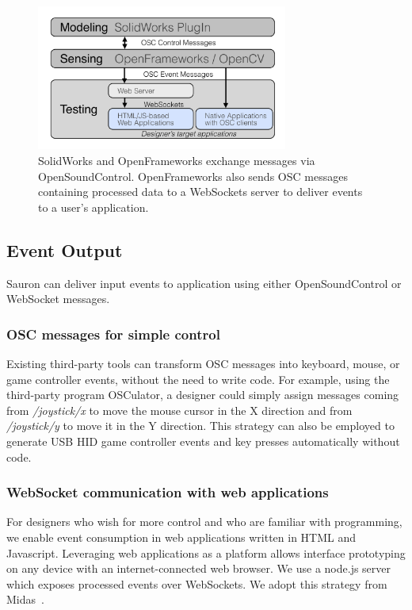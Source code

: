 \begin{figure}
\centering
\includegraphics[width=3.25in]{figures/sauron/arch2outlined.pdf}
\caption{SolidWorks and OpenFrameworks exchange messages via OpenSoundControl.  OpenFrameworks also sends OSC messages containing processed data to a WebSockets server to deliver events to a user's application.}
\label{fig:sauron-arch}
\end{figure}

\subsection{Event Output}
Sauron can deliver input events to application using either OpenSoundControl or WebSocket messages.

\subsubsection{OSC messages for simple control}

Existing third-party tools can transform OSC messages into keyboard, mouse, or game controller events, without the need to write code. For example, using the third-party program OSCulator, a designer could simply assign messages coming from {\em /joystick/x} to move the mouse cursor in the X direction and from {\em /joystick/y} to move it in the Y direction. This strategy can also be employed to generate USB HID game controller events and key presses automatically without code.

\subsubsection{WebSocket communication with web applications}

For designers who wish for more control and who are familiar with programming, we enable event consumption in web applications written in HTML and Javascript. Leveraging web applications as a platform allows interface prototyping on any device with an internet-connected web browser. 
We use a node.js server which exposes processed events over WebSockets. We adopt this strategy from Midas~\cite{savage-midas}. 

